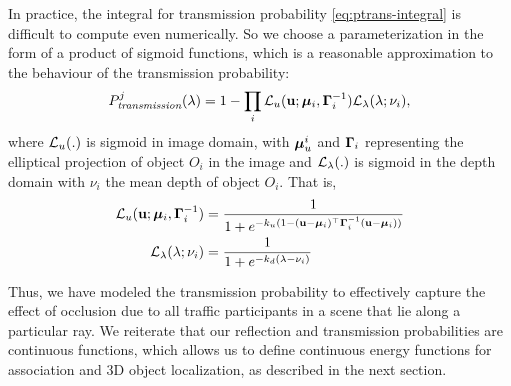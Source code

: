 In practice, the integral for transmission probability \eqref{eq:ptrans-integral} is difficult to compute even numerically. So we choose a parameterization in the form of a product of sigmoid functions, which is a reasonable approximation to the behaviour of the transmission probability:
%
\begin{align}
P^j_{\textit{transmission}}(\lambda) = 1 - \prod_i \mathcal{L}_u (\mathbf{u}; {\bm{\mu}}_i, \bm{\Gamma}_i^{-1}) \mathcal{L}_{\lambda}(\lambda; \nu_i),
\label{eq:evalCumulativePtrans}
\end{align}
%
where $\mathcal{L}_u(.)$ is sigmoid in image domain, with ${\bm{\mu}}^i_u$ and $\bm{\Gamma}_i$ representing the elliptical projection of object $O_i$ in the image and $\mathcal{L}_{\lambda}(.)$ is sigmoid in the depth domain with $\nu_i$ the mean depth of object $O_i$. That is,
%
\begin{align}
\mathcal{L}_u(\mathbf{u}; {\bm{\mu}}_i, \bm{\Gamma}_i^{-1}) &= \frac{1}{1 + e^{-k_u(1 - (\mathbf{u} - {\bm{\mu}}_i)^\top \bm{\Gamma}_i^{-1} (\mathbf{u} - {\bm{\mu}}_i))}} \\
\mathcal{L}_{\lambda}(\lambda; \nu_i) &= \frac{1}{1 + e^{-k_d(\lambda - \nu_i)}}
\end{align}
%

Thus, we have modeled the transmission probability to effectively capture the effect of occlusion due to all traffic participants in a scene that lie along a particular ray. We reiterate that our reflection and transmission probabilities are continuous functions, which allows us to define continuous energy functions for association and 3D object localization, as described in the next section.





